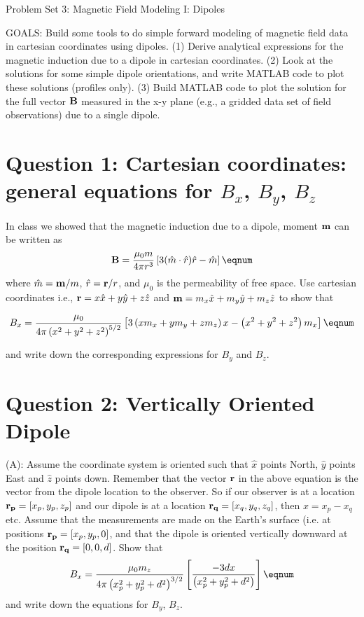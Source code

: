 

\headline{ \hfill \today}
\centerline {\bftv Problem Set 3: Magnetic Field Modeling I:  Dipoles}

 {\bftv\noindent GOALS:}  Build some tools to do simple forward modeling of magnetic field data in cartesian coordinates using dipoles.  
(1) Derive analytical expressions for the magnetic induction due to a dipole in cartesian coordinates.  (2) Look at the solutions for some simple dipole orientations, and write MATLAB code to plot these solutions (profiles only).  (3) Build MATLAB code to plot the solution for the full vector ${\bf B}$ measured in the x-y plane (e.g., a gridded data set of field observations) due to a single dipole.  

\section {Question 1:  Cartesian coordinates:  general equations for $B_x$, $B_y$, $B_z$}

\noindent In class we showed that the magnetic induction due to a dipole, moment ${\bf m}$ can be written as
$$ {\bf B} = {\mu_0 m \over 4\pi r^3} \left [ 3 (\hat m \cdot  \hat r) \hat r - \hat m \right ] \eqnum $$
\noindent where $\hat m = {\bf m} / m$, $\hat r = {\bf r} / r$, and $\mu_0$ is the permeability of free space.  
Use cartesian coordinates i.e., ${\bf r} = x \hat x + y \hat y + z \hat z$ and ${\bf m} = m_x \hat x + m_y \hat y + m_z \hat z$ to show that

$$ B_x = {\mu_0 \over 4 \pi \left ( x^2 + y^2 + z^2  \right )^{5/2}} \left [ 3 \left ( x m_x + y m_y + z m_z \right ) x - \left ( x^2 + y^2 + z^2  \right ) m_x \right ] \eqnum$$

\noindent and write down the corresponding expressions for $B_y$ and $B_z$.

\section {Question 2:  Vertically Oriented Dipole}

(A):  Assume the coordinate system is oriented such that $\hat x$ points North, $\hat y$ points East and $\hat z$ points down.  
Remember that the vector ${\bf r}$ in the above equation is the vector from the dipole location to the observer.    So if our observer
is at a location ${\bf r_p} = [x_p, y_p, z_p]$ and our dipole is at a location ${\bf r_q} = [x_q, y_q, z_q]$, then $x=x_p-x_q$ etc.   
Assume that the measurements are made on the Earth's surface (i.e. at positions ${\bf r_p} = [x_p, y_p, 0]$, and that the dipole is oriented vertically downward at the position ${\bf r_q} = [0, 0, d]$.
Show that
$$B_x = { \mu_0 m_z \over  4 \pi \left ( x_p^2 + y_p^2 + d^2  \right )^{3/2}} \left [{ - 3 d x \over  \left ( x_p^2 + y_p^2 + d^2  \right )} \right ] \eqnum$$
and write down the equations for $B_y$, $B_z$.

